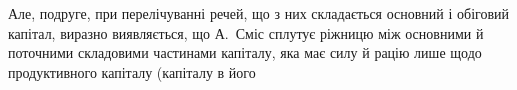 Але, подруге, при перелічуванні речей, що з них складається основний
і обіговий капітал, виразно виявляється, що А.~Сміс сплутує ріжницю
між основними й поточними складовими частинами капіталу, яка має
силу й рацію лише щодо продуктивного капіталу (капіталу в його
\parbreak{}  %

